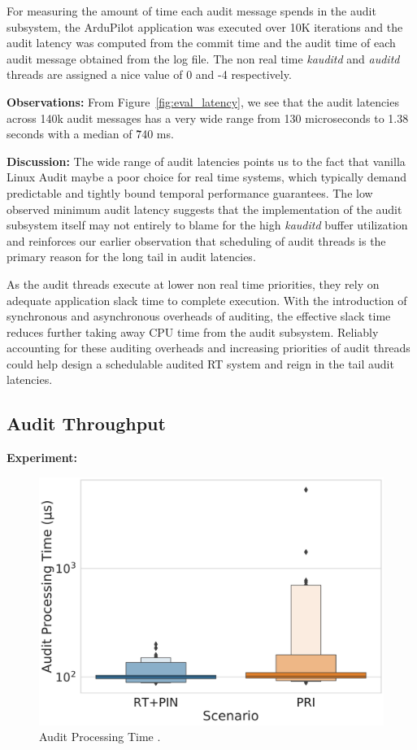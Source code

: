 For measuring the amount of time each audit message spends in the audit subsystem, the ArduPilot application was executed over 10K iterations and the audit latency was computed from the commit time and the audit time of each audit message obtained from the log file. The non real time \textit{kauditd} and \textit{auditd} threads are assigned a nice value of 0 and -4 respectively.

\textbf{Observations:} From Figure~\ref{fig:eval_latency}, we see that the audit latencies across 140k audit messages has a very wide range from 130 microseconds to 1.38 seconds with a median of \~740 ms. 

\textbf{Discussion:} 
The wide range of audit latencies points us to the fact that vanilla Linux Audit maybe a poor choice for real time systems, which typically demand predictable and tightly bound temporal performance guarantees. The low observed minimum audit latency suggests that the implementation of the audit subsystem itself may not entirely to blame for the high \textit{kauditd} buffer utilization and reinforces our earlier observation that scheduling of audit threads is the primary reason for the long tail in audit latencies.

As the audit threads execute at lower non real time priorities, they rely on adequate application slack time to complete execution. With the introduction of synchronous and asynchronous overheads of auditing, the effective slack time reduces further taking away CPU time from the audit subsystem. Reliably accounting for these auditing overheads and increasing priorities of audit threads could help design a schedulable audited RT system and reign in the tail audit latencies.

\subsection{Audit Throughput}
\textbf{Experiment:}
\begin{figure}[tbp]
    \centering
    \includegraphics[width=0.9\linewidth,keepaspectratio,scale=0.9]{fig/Throughput_cdf.pdf}
    \caption{\label{fig:eval_throughput}Audit Processing Time .}
\end{figure}

